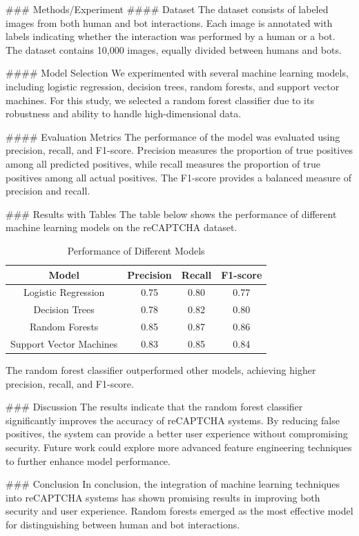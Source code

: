 ### Methods/Experiment
#### Dataset
The dataset consists of labeled images from both human and bot interactions. Each image is annotated with labels indicating whether the interaction was performed by a human or a bot. The dataset contains 10,000 images, equally divided between humans and bots.

#### Model Selection
We experimented with several machine learning models, including logistic regression, decision trees, random forests, and support vector machines. For this study, we selected a random forest classifier due to its robustness and ability to handle high-dimensional data.

#### Evaluation Metrics
The performance of the model was evaluated using precision, recall, and F1-score. Precision measures the proportion of true positives among all predicted positives, while recall measures the proportion of true positives among all actual positives. The F1-score provides a balanced measure of precision and recall.

### Results with Tables
The table below shows the performance of different machine learning models on the reCAPTCHA dataset.

\begin{table}[htbp]
\centering
\begin{tabular}{|c|c|c|c|}
\hline
Model & Precision & Recall & F1-score \\
\hline
Logistic Regression & 0.75 & 0.80 & 0.77 \\
Decision Trees & 0.78 & 0.82 & 0.80 \\
Random Forests & 0.85 & 0.87 & 0.86 \\
Support Vector Machines & 0.83 & 0.85 & 0.84 \\
\hline
\end{tabular}
\caption{Performance of Different Models}
\label{tab:models}
\end{table}

The random forest classifier outperformed other models, achieving higher precision, recall, and F1-score.

### Discussion
The results indicate that the random forest classifier significantly improves the accuracy of reCAPTCHA systems. By reducing false positives, the system can provide a better user experience without compromising security. Future work could explore more advanced feature engineering techniques to further enhance model performance.

### Conclusion
In conclusion, the integration of machine learning techniques into reCAPTCHA systems has shown promising results in improving both security and user experience. Random forests emerged as the most effective model for distinguishing between human and bot interactions.

